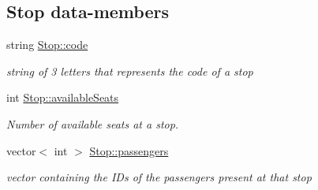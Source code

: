 \subsection*{Stop data-\/members}
\begin{DoxyCompactItemize}
\item 
\mbox{\label{group___date_ga5a0dddd108225fd437be86eed7b3a3ef}} 
string \hyperlink{group___date_ga5a0dddd108225fd437be86eed7b3a3ef}{Stop\+::code}
\begin{DoxyCompactList}\small\item\em string of 3 letters that represents the code of a stop \end{DoxyCompactList}\item 
\mbox{\label{group___date_ga459aba5bcfa17889d2f292f3f45528bc}} 
int \hyperlink{group___date_ga459aba5bcfa17889d2f292f3f45528bc}{Stop\+::available\+Seats}
\begin{DoxyCompactList}\small\item\em Number of available seats at a stop. \end{DoxyCompactList}\item 
\mbox{\label{group___date_ga2886c8f28932f3884ba3e4f741e7ec91}} 
vector$<$ int $>$ \hyperlink{group___date_ga2886c8f28932f3884ba3e4f741e7ec91}{Stop\+::passengers}
\begin{DoxyCompactList}\small\item\em vector containing the I\+Ds of the passengers present at that stop \end{DoxyCompactList}\end{DoxyCompactItemize}

